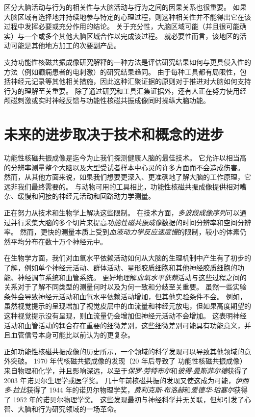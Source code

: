 区分大脑活动与行为的相关性与大脑活动与行为之间的因果关系也很重要。
如果大脑区域有选择地并持续地参与特定的心理过程，则这种相关性并不能得出它在该过程中发挥必要或充分作用的结论。
关于充分性，大脑区域可能（并且很可能确实）与一个或多个其他大脑区域合作以完成该过程。
就必要性而言，该地区的活动可能是其他地方加工的次要副产品。


支持功能性核磁共振成像研究解释的一种方法是评估研究结果如何与更具侵入性的方法（例如癫痫患者的电刺激）的研究结果趋同。
由于每种工具都有局限性，包括神经元记录等其他相关措施，因此这种汇聚证据的原则对于推进对大脑如何支持行为的理解至关重要。
除了通过研究和工具汇集证据外，还有人正在努力使用经颅磁刺激或实时神经反馈与功能性核磁共振成像同时操纵大脑功能。




\section{未来的进步取决于技术和概念的进步}

功能性核磁共振成像是迄今为止我们探测健康人脑的最佳技术。
它允许以相当高的分辨率测量整个大脑以及大型受试者样本中心灵的许多方面而不会造成伤害。
然而，从其他方面来说，如果我们想要更深入、更准确地了解大脑的工作原理，它远非我们最终需要的。
与动物可用的工具相比，功能性核磁共振成像提供相对嘈杂、缓慢和间接的神经元活动和回路动力学测量。


正在努力从技术和生物学上解决这些限制。
在技术方面，\textit{多波段成像序列}可以通过并行采集大脑的多个切片来提高\textit{功能性磁共振成像}数据的时间分辨率和空间分辨率。
然而，更快的测量本质上受到\textit{血液动力学反应速度慢}的限制，较小的体素仍然平均分布在数十万个神经元中。


在生物学方面，我们对血氧水平依赖活动如何从大脑的生理机制中产生有了初步的了解，例如单个神经元活动、群体活动、星形胶质细胞和其他神经胶质细胞的功能、神经调节系统和血管系统。
更好地理解\textit{血氧水平依赖}活动与这些过程之间的关系对于了解不同类型的测量何时以及为何一致和分歧至关重要。 
虽然一些实验条件会导致神经元活动和血氧水平依赖活动增加，但其他实验条件不会。
例如，虽然视觉提示的呈现增加了视觉皮层中的血流量和神经元放电，但如果高度期望的这种视觉提示没有呈现，则血流量仍会增加但神经元活动不会增加。
这表明神经活动和血管活动的耦合存在重要的细微差别，这些细微差别可能具有功能意义，并且血管信号本身可能比以前认为的更复杂。


正如功能性核磁共振成像的历史所示，一个领域的科学发现可以导致其他领域的意外突破。
1970 年代核磁共振成像的发现（20 年后导致了 功能性核磁共振成像）来自物理和化学，并且影响深远，以至于\textit{保罗$\cdot$劳特布尔}和\textit{彼得$\cdot$曼斯菲尔德}获得了 2003 年诺贝尔生理学或医学奖。
几十年前核磁共振的发现又使这成为可能，\textit{伊西多$\cdot$拉比}获得了 1944 年的诺贝尔物理学奖，\textit{费利克斯$\cdot$布洛赫}和\textit{爱德华$\cdot$珀塞尔}获得了 1952 年的诺贝尔物理学奖。
这些发现最初与神经科学并无关联，但却引发了心智、大脑和行为研究领域的一场革命。


